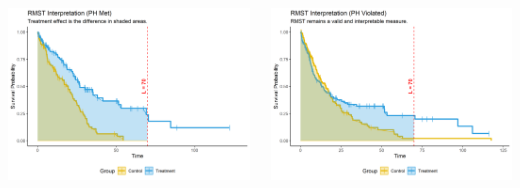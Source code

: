 \documentclass{beamer}
\begin{document}
\begin{frame}
\begin{columns}[T,onlytextwidth]
  \begin{column}{0.5\textwidth}
    \centering
    \includegraphics[width=\textwidth, height=0.7\textwidth]{images/rmst_causal_plot_ph_met.png}
  \end{column}
  \begin{column}{0.5\textwidth}
    \centering
    \includegraphics[width=\textwidth, height=0.7\textwidth]{images/rmst_causal_plot_ph_violated.png}
  \end{column}
\end{columns}

\end{frame}



\end{document}
